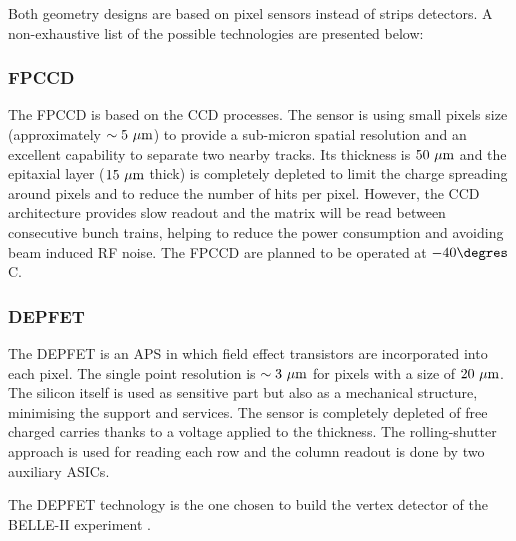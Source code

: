 
   Both geometry designs are based on  pixel sensors instead of strips detectors.
   A non-exhaustive list of the possible technologies are presented below:
    
   \subsubsection{FPCCD}
   
     The \gls{FPCCD} \cite{CalanchaParedes} is based on the \gls{CCD} processes.
     The sensor is using small pixels size (approximately $\sim 5~\rm{\mu m}$) to provide a sub-micron spatial resolution and an excellent capability to separate two nearby tracks.
     Its thickness is $50~\rm{\mu m}$ and the epitaxial layer ($15~\rm{\mu m}$ thick) is completely depleted to limit the charge spreading around pixels and to reduce the number of hits per pixel.
     However, the \gls{CCD} architecture provides slow readout and the matrix will be read between consecutive bunch trains, helping to reduce the power consumption and avoiding beam induced RF noise.
     The \gls{FPCCD} are planned to be operated at $-40 \degres$C.

   \subsubsection{DEPFET}
    
    The \gls{DEPFET} \cite{Richter2003} is an \gls{APS} in which field effect transistors are incorporated into each pixel.
    The single point resolution is $\sim 3~\rm{\mu m}$ for pixels with a size of $20~\rm{\mu m}$.
    The silicon itself is used as sensitive part but also as a mechanical structure, minimising the support and services.
    The sensor is completely depleted of free charged carries thanks to a voltage applied to the thickness.
    The rolling-shutter approach is used for reading each row and the column readout is done by two auxiliary \glspl{ASIC}.

    The \gls{DEPFET} technology is the one chosen  to build the vertex detector of the BELLE-II experiment \cite{depfetBelleII}.

